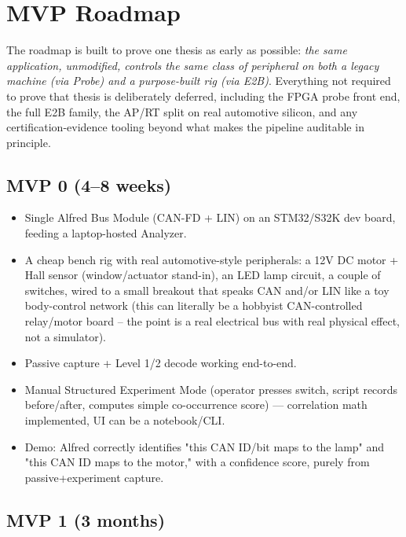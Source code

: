 \section{MVP Roadmap}
\label{sec:roadmap}

The roadmap is built to prove one thesis as early as possible: \emph{the same application, unmodified, controls the same class of peripheral on both a legacy machine (via Probe) and a purpose-built rig (via E2B)}. Everything not required to prove that thesis is deliberately deferred, including the FPGA probe front end, the full E2B family, the AP/RT split on real automotive silicon, and any certification-evidence tooling beyond what makes the pipeline auditable in principle.

\subsection{MVP 0 (4--8 weeks)}

\begin{itemize}
\item Single Alfred Bus Module (CAN-FD + LIN) on an STM32/S32K dev board, feeding a laptop-hosted Analyzer.
\item A cheap bench rig with real automotive-style peripherals: a 12V DC motor + Hall sensor (window/actuator stand-in), an LED lamp circuit, a couple of switches, wired to a small breakout that speaks CAN and/or LIN like a toy body-control network (this can literally be a hobbyist CAN-controlled relay/motor board -- the point is a real electrical bus with real physical effect, not a simulator).
\item Passive capture + Level 1/2 decode working end-to-end.
\item Manual Structured Experiment Mode (operator presses switch, script records before/after, computes simple co-occurrence score) --- correlation math implemented, UI can be a notebook/CLI.
\item Demo: Alfred correctly identifies "this CAN ID/bit maps to the lamp" and "this CAN ID maps to the motor," with a confidence score, purely from passive+experiment capture.
\end{itemize}

\subsection{MVP 1 (3 months)}

